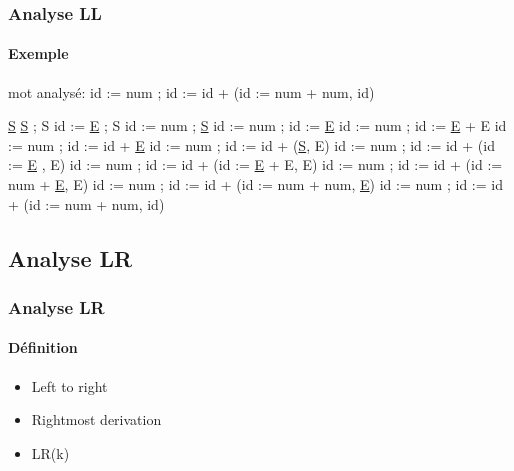 \documentclass{beamer}
\begin{document}
\begin{frame}\frametitle{Analyse LL}\framesubtitle{Exemple}

	mot analysé:   id := num ; id := id + (id := num + num, id)

	\newline\newline
	\underline{S}\newline
	\underline{S} ; S\newline
	id := \underline{E} ; S\newline
	id := num ; \underline{S}\newline
	id := num ; id := \underline{E}\newline
	id := num ; id := \underline{E} + E\newline
	id := num ; id := id + \underline{E}\newline
	id := num ; id := id + (\underline{S}, E)\newline
	id := num ; id := id + (id := \underline{E} , E)\newline
	id := num ; id := id + (id := \underline{E} + E, E)\newline
	id := num ; id := id + (id := num + \underline{E}, E)\newline
	id := num ; id := id + (id := num + num, \underline{E})\newline
	id := num ; id := id + (id := num + num, id)\newline

\end{frame}

\subsection{Analyse LR}

\begin{frame}\frametitle{Analyse LR}\framesubtitle{Définition}

	\begin{itemize}
				\item Left to right\newline
				\item Rightmost derivation\newline
				\item LR(k)\newline
	\end{itemize}

\end{frame}
\end{document}

